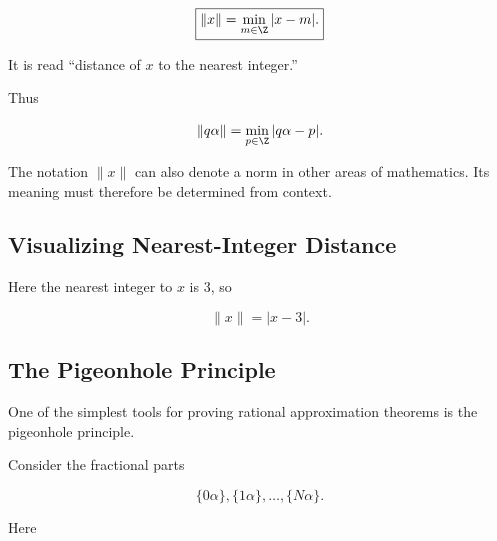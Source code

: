 \[ \boxed{\|x\|=\min_{m\in\Z}|x-m|.} \]

It is read ``distance of \(x\) to the nearest integer.''

Thus

\[ \|q\alpha\|=\min_{p\in\Z}|q\alpha-p|. \]

\begin{warningbox}
The notation \(\|x\|\) can also denote a norm in other areas of mathematics.
Its meaning must therefore be determined from context.
\end{warningbox}

\subsection{Visualizing Nearest-Integer Distance}
\label{subsec:nearest-integer-distance-visual}

\begin{centereddiagram}
\end{centereddiagram}

Here the nearest integer to \(x\) is \(3\), so

\[ \|x\|=|x-3|. \]

\subsection{The Pigeonhole Principle}
\label{subsec:pigeonhole-diophantine}

One of the simplest tools for proving rational approximation theorems is the
pigeonhole principle.

Consider the fractional parts

\[ \{0\alpha\},\{1\alpha\},\ldots,\{N\alpha\}. \]

Here


